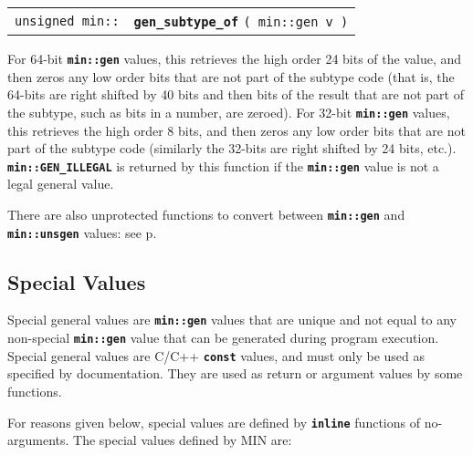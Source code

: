 \documentclass[12pt]{article}
\makeatletter
\newcommand{\TT}[1]{{\tt \bfseries #1}}
\newcommand{\ttindex}[1]{\index{#1@{\tt #1}}}
\newcommand{\pagref}[1]{p\pageref{#1}}
\newcommand{\EOL}{\penalty \exhyphenpenalty}
\newenvironment{indpar}[1][0.3in]%
	{\begin{list}{}%
		     {\setlength{\itemsep}{0in}%
		      \setlength{\topsep}{0in}%
		      \setlength{\parsep}{1ex}%
		      \setlength{\labelwidth}{#1}%
		      \setlength{\leftmargin}{#1}%
		      \addtolength{\leftmargin}{\labelsep}}%
	 \item}%
	{\end{list}}
\newcommand{\LABEL}[1]{\label{#1}}
\newcommand{\MINKEY}[1]%
	   {\TT{#1}\ttindex{min::#1}\ttindex{#1}}
\makeatother
\begin{document}
\begin{indpar}\begin{tabular}{r@{}l}
\verb|unsigned min::| & \MINKEY{gen\_subtype\_of} \verb|( min::gen v )|
\LABEL{MIN::GEN_SUBTYPE_OF} \\
\end{tabular}\end{indpar}

For 64-bit \TT{min::gen} values, this retrieves the high order
24 bits of the value, and then zeros any low order bits that are not
part of the subtype code (that is, the 64-bits are right shifted by
40 bits and then bits of the result that are not part of the
subtype, such as bits in a number, are zeroed).
For 32-bit \TT{min::gen} values, this retrieves
the high order 8 bits, and then zeros any low order bits that are not
part of the subtype code (similarly the 32-bits are right shifted by
24 bits, etc.).
\TT{min::GEN\_ILLEGAL} is returned by this function if the \TT{min::gen}
value is not a legal general value.

There are also unprotected functions to convert between
\TT{min::\EOL gen} and \TT{min::\EOL unsgen} values:
see \pagref{MUP::NEW_GEN}.

\subsection{Special Values}
\label{SPECIAL-VALUES}

Special general values are \TT{min::gen} values that are unique
and not equal to any non-special \TT{min::\EOL gen}
value that can be generated during
program execution.  Special general values are C/C++ \TT{const}
values, and must only be used as specified by documentation.
They are used as return or argument values by some functions.

For reasons given below, special values are defined by \TT{inline}
functions of no-arguments.
The special values defined by MIN are:
\end{document}
